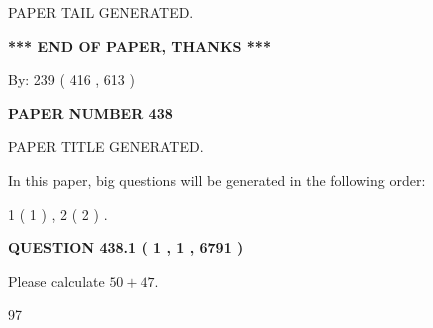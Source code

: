 \documentclass[12pt]{article}
\begin{document}
   
   
   
   
   
 \vspace{0.2in}
 
   
   
\vspace{2.0in} PAPER TAIL GENERATED.
   
   
   
   
\vspace{1.0in} 
{\textbf{\large{ *** END OF PAPER, THANKS *** }}} 
   
   
\hspace{1.0in} By: 
 239 ( 416 ,  613 )
   
   
   
   
\newpage 
\setcounter{page}{ 
   438001 } 
   
   
   
   
 {\textbf{ \Large{ PAPER NUMBER  438  }}}
   
   
\vspace{0.2in}
   
   
   
   
   
   
   
   
 \vspace{0.2in}
 
 
 
 
   
   
 PAPER TITLE GENERATED.
   
   
   
\vspace{0.2in}
   
In this paper, big questions will be generated in the following order: 
   
   
   1 ( 1 )
 ,
   2 ( 2 )
 .
  
\vspace{0.2in}
  
{\textbf{\Large{QUESTION
438.1 
 ( 1 , 1 , 6791 )
}}}
  
  
 
Please calculate $ %
50 +  %
47 $.
 
 
 
\noindent{}
 
 

97
 
 
\noindent{}
 
\end{document}
